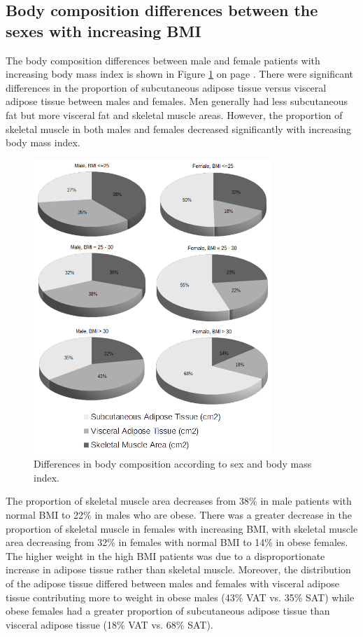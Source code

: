 \subsection{Body composition differences between the sexes with increasing BMI}
The body composition differences between male and female patients with increasing body mass index is shown in Figure \ref{fig:bc_gender_bmi} on page \pageref{fig:bc_gender_bmi}. There were significant differences in the proportion of subcutaneous adipose tissue versus visceral adipose tissue between males and females. Men generally had less subcutaneous fat but more visceral fat and skeletal muscle areas. However, the proportion of skeletal muscle in both males and females decreased significantly with increasing body mass index.

\begin{figure}[h]
	\centering
	\includegraphics[width=0.8\textwidth]{Figures/bc_gender_bmi_pie}
	\caption{Differences in body composition according to sex and body mass index.}
	\label{fig:bc_gender_bmi}
\end{figure}

The proportion of skeletal muscle area decreases from 38\% in male patients with normal BMI to 22\% in males who are obese. There was a greater decrease in the proportion of skeletal muscle in females with increasing BMI, with skeletal muscle area decreasing from 32\% in females with normal BMI to 14\% in obese females. The higher weight in the high BMI patients was due to a disproportionate increase in adipose tissue rather than skeletal muscle. Moreover, the distribution of the adipose tissue differed between males and females with visceral adipose tissue contributing more to weight in obese males (43\% VAT vs. 35\% SAT) while obese females had a greater proportion of subcutaneous adipose tissue than visceral adipose tissue (18\% VAT vs. 68\% SAT).

